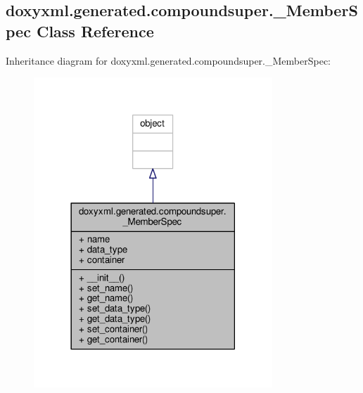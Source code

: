 \subsection{doxyxml.\+generated.\+compoundsuper.\+\_\+\+Member\+Spec Class Reference}
\label{classdoxyxml_1_1generated_1_1compoundsuper_1_1__MemberSpec}


Inheritance diagram for doxyxml.\+generated.\+compoundsuper.\+\_\+\+Member\+Spec\+:
\nopagebreak
\begin{figure}[H]
\begin{center}
\leavevmode
\includegraphics[width=254pt]{de/d0b/classdoxyxml_1_1generated_1_1compoundsuper_1_1__MemberSpec__inherit__graph}
\end{center}
\end{figure}


